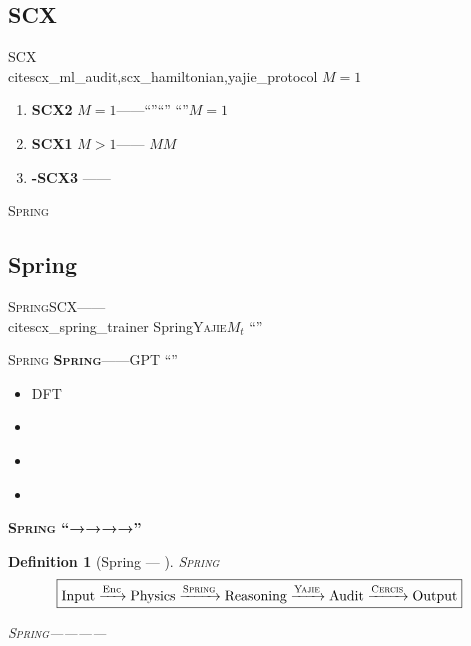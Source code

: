 \documentclass[12pt,a4paper]{article}
\newtheorem{definition}[theorem]{Definition}
\theoremstyle{remark}
\newcommand{\SCX}{\textsc{SCX}}
\newcommand{\Spring}{\textsc{Spring}}
\newcommand{\Yajie}{\textsc{Yajie}}
\newcommand{\Cercis}{\textsc{Cercis}}
\DeclareMathOperator{\Enc}{Enc}
\begin{document}
\subsection{SCX}

\SCX{}~\\cite{scx_ml_audit,scx_hamiltonian,yajie_protocol}
$M=1$

\begin{enumerate}[label=\textbf{ \arabic*},leftmargin=*,itemsep=4pt]
    \item \textbf{SCX2}
    $M=1$——“”“”
    “”$M=1$
    
    \item \textbf{SCX1}
    $M>1$——
    $M$$M$
    
    \item \textbf{-SCX3}
    ——
    
\end{enumerate}

\textbf{}

\Spring{}

\subsection{Spring}

\Spring{}SCX——~\\cite{scx_spring_trainer}
Spring\Yajie{}$M_t$
“”

\Spring{}
\textbf{\Spring{}}——GPT
“”

\begin{itemize}[nosep]
    \item \textbf{} DFT
    \item \textbf{} 
    \item \textbf{} 
    \item \textbf{} 
\end{itemize}

\textbf{\Spring{}
“→→→→”}



\begin{definition}[Spring — ]\label{def:spring_framework}
\Spring{}
\begin{equation}\label{eq:spring_pipeline}
    \boxed{
    \text{Input} \xrightarrow{\Enc} \text{Physics} \xrightarrow{\Spring} \text{Reasoning} \xrightarrow{\Yajie} \text{Audit} \xrightarrow{\Cercis} \text{Output}
    }
\end{equation}

\Spring{}————
\textbf{}
\end{definition}
\end{document}

